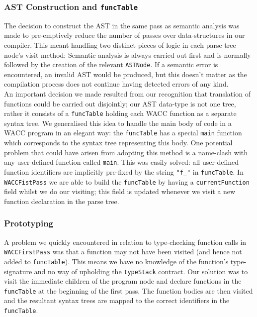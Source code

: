 \documentclass[a4wide, 10pt]{article}
\begin{document}
\subsubsection*{AST Construction and \texttt{funcTable}}

The decision to construct the AST in the same pass as semantic analysis was made to pre-emptively reduce the number of passes over data-structures in our compiler. This meant handling two distinct pieces of logic in each parse tree node's visit method: Semantic analysis is always carried out first and is normally followed by the creation of the relevant \texttt{ASTNode}. If a semantic error is encountered, an invalid AST would be produced, but this doesn't matter as the compilation process does not continue having detected errors of any kind.\\ An important decision we made resulted from our recognition that translation of functions could be carried out disjointly; our AST data-type is not one tree, rather it consists of a \texttt{funcTable} holding each WACC function as a separate syntax tree. We generalised this idea to handle the main body of code in a WACC program in an elegant way: the \texttt{funcTable} has a special \texttt{main} function which corresponds to the syntax tree representing this body. One potential problem that could have arisen from adopting this method is a name-clash with any user-defined function called \texttt{main}. This was easily solved: all user-defined function identifiers are implicitly pre-fixed by the string \texttt{"f\_"} in \texttt{funcTable}. In \texttt{WACCFistPass} we are able to build the \texttt{funcTable} by having a \texttt{currentFunction} field whilst we do our visiting; this field is updated whenever we visit a new function declaration in the parse tree. 

\subsubsection*{Prototyping}
  
\noindent A problem we quickly encountered in relation to type-checking function calls in \texttt{WACCFirstPass} was that a function may not have been visited (and hence not added to \texttt{funcTable}). This means we have no knowledge of the function's type-signature and no way of upholding the \texttt{typeStack} contract. Our solution was to visit the immediate children of the program node and declare functions in the \texttt{funcTable} at the beginning of the first pass. The function bodies are then visited and the resultant syntax trees are mapped to the correct identifiers in the \texttt{funcTable}.   
\end{document}
